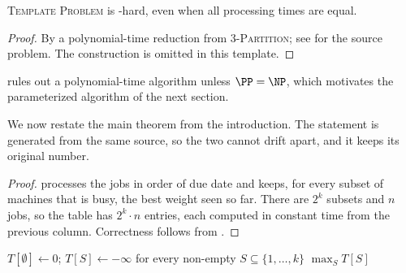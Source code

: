 
\label{sec:hardness}

\begin{theorem}
\label{thm:hardness}\hypertarget{target:thm:hardness}{}%
\textsc{Template Problem} is \NP-hard, even when all processing times are equal.
\end{theorem}

\begin{proof}
By a polynomial-time reduction from \textsc{3-Partition}; see \cite{GJ79} for the source problem.
The construction is omitted in this template.
\end{proof}

 rules out a polynomial-time algorithm unless $\PP=\NP$, which motivates the parameterized algorithm of the next section.

\label{sec:algorithms}

We now restate the main theorem from the introduction. The statement is generated from the same source, so the two cannot drift apart, and it keeps its original number.

\MainTheorem*

\begin{proof}
 processes the jobs in order of due date and keeps, for every subset of machines that is busy, the best weight seen so far.
There are $2^k$ subsets and $n$ jobs, so the table has $2^k\cdot n$ entries, each computed in constant time from the previous column.
Correctness follows from .
\end{proof}

\begin{algorithm}[htb]
\caption{A dynamic program for \textsc{Template Problem}}
\label{alg:dp}
$T[\emptyset]\gets 0$; $T[S]\gets-\infty$ for every non-empty $S\subseteq\{1,\ldots,k\}$\;
\Return $\max_S T[S]$\;
\end{algorithm}

